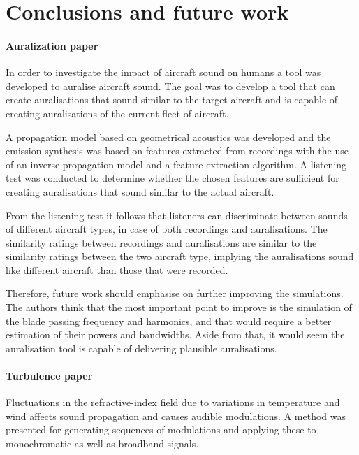 \chapter{Conclusions and future work}\label{chapter:conclusions}


\subsubsection{Auralization paper}
In order to investigate the impact of aircraft sound on humans a tool was
developed to auralise aircraft sound. The goal was to develop a tool that can
create auralisations that sound similar to the target aircraft and is capable of
creating auralisations of the current fleet of aircraft.

A propagation model based on geometrical acoustics was developed and the
emission synthesis was based on features extracted from recordings with the use
of an inverse propagation model and a feature extraction algorithm. A listening
test was conducted to determine whether the chosen features are sufficient for
creating auralisations that sound similar to the actual aircraft.

From the listening test it follows that listeners can discriminate between
sounds of different aircraft types, in case of both recordings and
auralisations. The similarity ratings between recordings and auralisations are
similar to the similarity ratings between the two aircraft type, implying the
auralisations sound like different aircraft than those that were recorded.

Therefore, future work should emphasise on further improving the simulations.
The authors think that the most important point to improve is the simulation of
the blade passing frequency and harmonics, and that would require a better
estimation of their powers and bandwidths. Aside from that, it would seem the
auralisation tool is capable of delivering plausible auralisations.

\subsubsection{Turbulence paper}
Fluctuations in the refractive-index field due to variations in temperature and
wind affects sound propagation and causes audible modulations. A method was
presented for generating sequences of modulations and applying these to
monochromatic as well as broadband signals.

